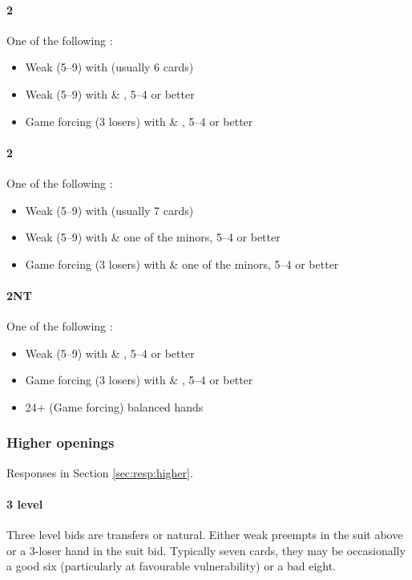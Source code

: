 \paragraph{2\hearts}
One of the following :
\begin{itemize}
\item Weak (5--9) with \spades (usually 6 cards)
\item Weak (5--9) with \clubs \& \diamonds, 5--4 or better
\item Game forcing (3 losers) with \clubs \& \diamonds, 5--4 or better
\end{itemize}

\paragraph{2\spades}
One of the following :
\begin{itemize}
\item Weak (5--9) with \clubs (usually 7 cards)
\item Weak (5--9) with \hearts \& one of the minors, 5--4 or better
\item Game forcing (3 losers) with \hearts \& one of the minors, 5--4 or better 
\end{itemize}

\paragraph{2NT}
One of the following :
\begin{itemize}
\item Weak (5--9) with \spades \& \diamonds, 5--4 or better
\item Game forcing (3 losers) with \spades \& \diamonds, 5--4 or better
\item 24+ (Game forcing) balanced hands
\end{itemize}

\subsubsection{Higher openings}
\label{sec:open:higher}

Responses in Section \ref{sec:resp:higher}.

\paragraph{3 level}

Three level bids are transfers or natural. Either weak preempts in the suit above or a 3-loser hand in the suit bid.
Typically seven cards, they may be occasionally a good six (particularly at
favourable vulnerability) or a bad eight.

